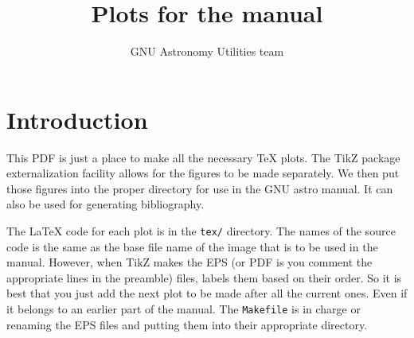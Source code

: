 \documentclass[a4paper]{article}
\author{GNU Astronomy Utilities team}
\title{Plots for the manual}
\begin{document}
\maketitle

\section{Introduction}\label{intro}

This PDF is just a place to make all the necessary \TeX{} plots. The
TikZ package externalization facility allows for the figures to be
made separately. We then put those figures into the proper directory
for use in the GNU astro manual. It can also be used for generating
bibliography.

The \LaTeX{} code for each plot is in the \texttt{tex/} directory. The
names of the source code is the same as the base file name of the
image that is to be used in the manual. However, when TikZ makes the
EPS (or PDF is you comment the appropriate lines in the preamble)
files, labels them based on their order. So it is best that you just
add the next plot to be made after all the current ones. Even if it
belongs to an earlier part of the manual. The \texttt{Makefile} is in
charge or renaming the EPS files and putting them into their
appropriate directory.




\end{document}
